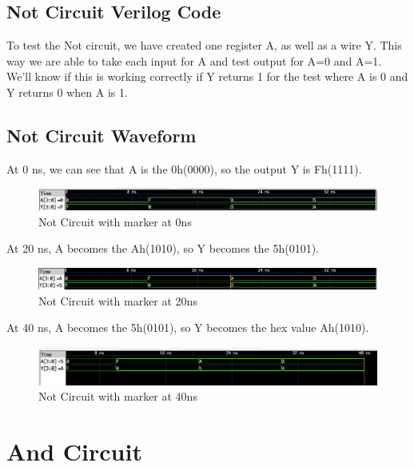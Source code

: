\documentclass[12pt]{article}
\begin{document}
\subsection{Not Circuit Verilog Code}


To test the Not circuit, we have created one register A, as well as a wire Y. This way we are able to take each input for A and test output for A=0 and A=1. We'll know if this is working correctly if Y returns 1 for the test where A is 0 and Y returns 0 when A is 1.


\subsection{Not Circuit Waveform}
At 0 ns, we can see that A is the 0h(0000), so the output Y is Fh(1111).
\begin{figure}[H]
    \centering
    \includegraphics[width = 1.0\textwidth]{Not/Not-0ns.png}
    \caption{Not Circuit with marker at 0ns}
    \label{fig:enter-label}
\end{figure}

At 20 ns, A becomes the Ah(1010), so Y becomes the 5h(0101).
\begin{figure}[H]
    \centering
    \includegraphics[width = 1.0\textwidth]{Not/Not-20ns.png}
    \caption{Not Circuit with marker at 20ns}
    \label{fig:enter-label}
\end{figure}

At 40 ns, A becomes the 5h(0101), so Y becomes the hex value Ah(1010).
\begin{figure}[H]
    \centering
    \includegraphics[width = 1.0\textwidth]{Not/Not-40ns.png}
    \caption{Not Circuit with marker at 40ns}
    \label{fig:enter-label}
\end{figure}

\section{And Circuit}
\end{document}

